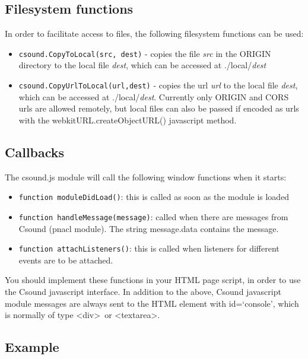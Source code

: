 \documentclass[11pt]{article}
\begin{document}
\subsection{Filesystem functions}

In order to facilitate access to files, the following filesystem functions can be used:

\begin{itemize}
\item {\tt csound.CopyToLocal(src, dest)} - copies the file \emph{src} in the ORIGIN directory to the local file \emph{dest}, which can
be accessed at ./local/\emph{dest}
\item {\tt csound.CopyUrlToLocal(url,dest)} - copies the url \emph{url} to the local file \emph{dest}, which can
be accessed at ./local/\emph{dest}. Currently only ORIGIN and CORS urls are allowed remotely, but local files can
also be passed if encoded as urls with the webkitURL.createObjectURL() javascript method.
\end{itemize}


\subsection{Callbacks}

The csound.js module will call the following window functions when it starts:

\begin{itemize} 
\item {\tt function moduleDidLoad()}: this is called as soon as the module is loaded 
\item {\tt function handleMessage(message)}: called when there are messages from Csound (pnacl module). 
The string message.data contains the message.
\item {\tt function attachListeners()}: this is called when listeners for different events are to be attached. 
\end{itemize}

You should implement these functions in your HTML page script, in order to use the Csound javascript interface.
In addition to the above, Csound javascript module messages are always sent to the HTML element with id=`console', 
which is normally of type \textless div\textgreater \, or \textless textarea\textgreater .

\subsection{Example}
\end{document}
